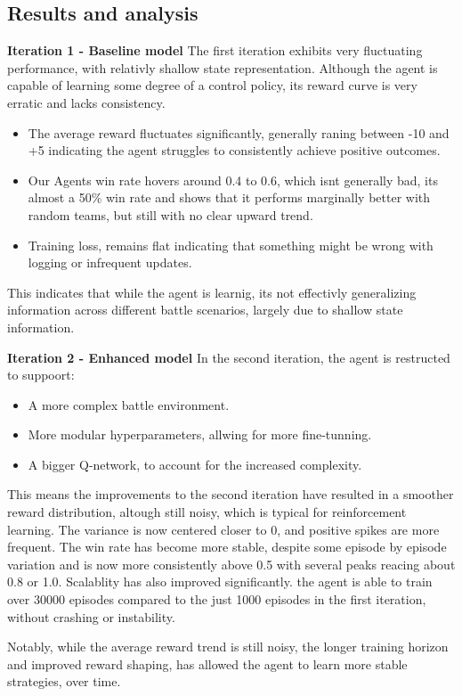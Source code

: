 \subsection{Results and analysis}
\textbf{Iteration 1 - Baseline model}
The first iteration exhibits very fluctuating performance, with relativly shallow 
state representation. Although the agent is capable of learning some degree of a control
policy, its reward curve is very erratic and lacks consistency.
\begin{itemize}
    \item The average reward fluctuates significantly, generally raning between -10 and +5
    indicating the agent struggles to consistently achieve positive outcomes.
    \item Our Agents win rate hovers around 0.4 to 0.6, which isnt generally bad, its almost a 50\% win rate
    and shows that it performs marginally better with random teams, but still with no clear upward trend.
    \item Training loss, remains flat indicating that something might be wrong with logging or infrequent updates.
\end{itemize}
This indicates that while the agent is learnig, its not effectivly generalizing 
information across different battle scenarios, largely due to shallow state information.

\textbf{Iteration 2 - Enhanced model}
In the second iteration, the agent is restructed to suppoort:
\begin{itemize}
    \item A more complex battle environment.
    \item More modular hyperparameters, allwing for more fine-tunning.
    \item A bigger Q-network, to account for the increased complexity.
\end{itemize}
This means the improvements to the second iteration have resulted in a smoother reward
distribution, altough still noisy, which is typical for reinforcement learning. The variance
is now centered closer to 0, and positive spikes are more frequent. The win rate 
has become more stable, despite some episode by episode variation 
and is now more consistently above 0.5 with several peaks reacing about 0.8 or 1.0.
Scalablity has also improved significantly. the agent is able to train over 30000 episodes
compared to the just 1000 episodes in the first iteration, without crashing or instability.

Notably, while the average reward trend is still noisy, the longer training horizon
and improved reward shaping, has allowed the agent to learn more stable strategies, over time.
